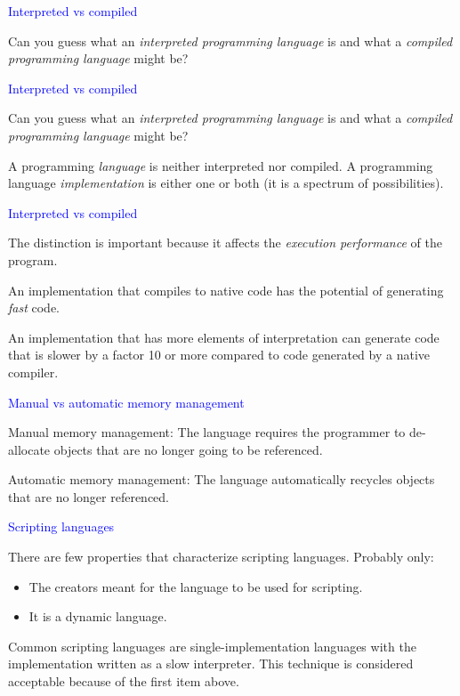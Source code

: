 \documentclass{slides}
\newcommand{\ti}[1]{\begin{center}\Large{\textcolor{blue}{#1}}\end{center}}
\begin{document}
\begin{slide}\ti{Interpreted vs compiled}

Can you guess what an \emph{interpreted programming language} is and
what a \emph{compiled programming language} might be?

\vfill\end{slide}
\begin{slide}\ti{Interpreted vs compiled}

Can you guess what an \emph{interpreted programming language} is and
what a \emph{compiled programming language} might be?

A programming \emph{language} is neither interpreted nor compiled.  A
programming language \emph{implementation} is either one or both (it
is a spectrum of possibilities).

\vfill\end{slide}
\begin{slide}\ti{Interpreted vs compiled}

The distinction is important because it affects the \emph{execution
  performance} of the program.

An implementation that compiles to native code has the potential of
generating \emph{fast} code.

An implementation that has more elements of interpretation can
generate code that is slower by a factor 10 or more compared to code
generated by a native compiler.

\vfill\end{slide}
\begin{slide}\ti{Manual vs automatic memory management}

Manual memory management: The language requires the programmer to
de-allocate objects that are no longer going to be referenced.

Automatic memory management: The language automatically recycles
objects that are no longer referenced.

\vfill\end{slide}
\begin{slide}\ti{Scripting languages}

There are few properties that characterize scripting languages.
Probably only:

\begin{itemize}
\item The creators meant for the language to be used for scripting.
\item It is a dynamic language.
\end{itemize}

Common scripting languages are single-implementation languages with
the implementation written as a slow interpreter.  This technique is
considered acceptable because of the first item above.

\vfill\end{slide}
\end{document}
